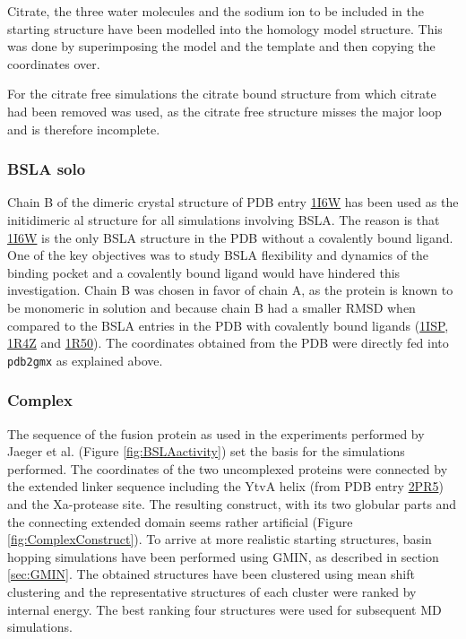 \documentclass[english, a4paper, 12pt, titlepage, draft]{article}
\newcommand{\PDB}[1]{\href{http://pdb.rcsb.org/pdb/explore/explore.do?structureId=#1}{#1}}
\begin{document}
Citrate, the three water molecules and the sodium ion to be included in the starting structure have been modelled into the homology model structure.
This was done by superimposing the model and the template and then copying the coordinates over.

For the citrate free simulations the citrate bound structure from which citrate had been removed was used, as the citrate free structure misses the major loop and is therefore incomplete.

\subsubsection{BSLA solo}

Chain B of the dimeric crystal structure of PDB entry \PDB{1I6W} has been used as the initidimeric al structure for all simulations involving BSLA.
The reason is that \PDB{1I6W} is the only BSLA structure in the PDB without a covalently bound ligand.
One of the key objectives was to study BSLA flexibility and dynamics of the binding pocket and a covalently bound ligand would have hindered this investigation.
Chain B was chosen in favor of chain A, as the protein is known to be monomeric in solution and because chain B had a smaller RMSD when compared to the BSLA entries in the PDB with covalently bound ligands (\PDB{1ISP}, \PDB{1R4Z} and \PDB{1R50}).
The coordinates obtained from the PDB were directly fed into \texttt{pdb2gmx} as explained above.


\subsubsection{Complex}

The sequence of the fusion protein as used in the experiments performed by Jaeger et al. (Figure \ref{fig:BSLAactivity}) set the basis for the simulations performed.
The coordinates of the two uncomplexed proteins were connected by the extended linker sequence including the YtvA helix (from PDB entry \PDB{2PR5}) and the Xa-protease site.
The resulting construct, with its two globular parts and the connecting extended domain seems rather artificial (Figure \ref{fig:ComplexConstruct}).
To arrive at more realistic starting structures, basin hopping simulations have been performed using GMIN, as described in section \ref{sec:GMIN}.
The obtained structures have been clustered using mean shift clustering and the representative structures of each cluster were ranked by internal energy.
The best ranking four structures were used for subsequent MD simulations.
\end{document}
